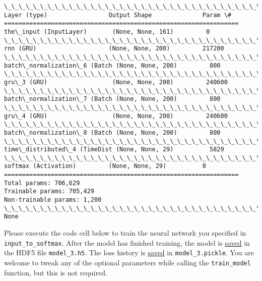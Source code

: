 \documentclass[11pt]{article}
\begin{document}
    \begin{Verbatim}[commandchars=\\\{\}]
\_\_\_\_\_\_\_\_\_\_\_\_\_\_\_\_\_\_\_\_\_\_\_\_\_\_\_\_\_\_\_\_\_\_\_\_\_\_\_\_\_\_\_\_\_\_\_\_\_\_\_\_\_\_\_\_\_\_\_\_\_\_\_\_\_
Layer (type)                 Output Shape              Param \#   
=================================================================
the\_input (InputLayer)       (None, None, 161)         0         
\_\_\_\_\_\_\_\_\_\_\_\_\_\_\_\_\_\_\_\_\_\_\_\_\_\_\_\_\_\_\_\_\_\_\_\_\_\_\_\_\_\_\_\_\_\_\_\_\_\_\_\_\_\_\_\_\_\_\_\_\_\_\_\_\_
rnn (GRU)                    (None, None, 200)         217200    
\_\_\_\_\_\_\_\_\_\_\_\_\_\_\_\_\_\_\_\_\_\_\_\_\_\_\_\_\_\_\_\_\_\_\_\_\_\_\_\_\_\_\_\_\_\_\_\_\_\_\_\_\_\_\_\_\_\_\_\_\_\_\_\_\_
batch\_normalization\_6 (Batch (None, None, 200)         800       
\_\_\_\_\_\_\_\_\_\_\_\_\_\_\_\_\_\_\_\_\_\_\_\_\_\_\_\_\_\_\_\_\_\_\_\_\_\_\_\_\_\_\_\_\_\_\_\_\_\_\_\_\_\_\_\_\_\_\_\_\_\_\_\_\_
gru\_3 (GRU)                  (None, None, 200)         240600    
\_\_\_\_\_\_\_\_\_\_\_\_\_\_\_\_\_\_\_\_\_\_\_\_\_\_\_\_\_\_\_\_\_\_\_\_\_\_\_\_\_\_\_\_\_\_\_\_\_\_\_\_\_\_\_\_\_\_\_\_\_\_\_\_\_
batch\_normalization\_7 (Batch (None, None, 200)         800       
\_\_\_\_\_\_\_\_\_\_\_\_\_\_\_\_\_\_\_\_\_\_\_\_\_\_\_\_\_\_\_\_\_\_\_\_\_\_\_\_\_\_\_\_\_\_\_\_\_\_\_\_\_\_\_\_\_\_\_\_\_\_\_\_\_
gru\_4 (GRU)                  (None, None, 200)         240600    
\_\_\_\_\_\_\_\_\_\_\_\_\_\_\_\_\_\_\_\_\_\_\_\_\_\_\_\_\_\_\_\_\_\_\_\_\_\_\_\_\_\_\_\_\_\_\_\_\_\_\_\_\_\_\_\_\_\_\_\_\_\_\_\_\_
batch\_normalization\_8 (Batch (None, None, 200)         800       
\_\_\_\_\_\_\_\_\_\_\_\_\_\_\_\_\_\_\_\_\_\_\_\_\_\_\_\_\_\_\_\_\_\_\_\_\_\_\_\_\_\_\_\_\_\_\_\_\_\_\_\_\_\_\_\_\_\_\_\_\_\_\_\_\_
time\_distributed\_4 (TimeDist (None, None, 29)          5829      
\_\_\_\_\_\_\_\_\_\_\_\_\_\_\_\_\_\_\_\_\_\_\_\_\_\_\_\_\_\_\_\_\_\_\_\_\_\_\_\_\_\_\_\_\_\_\_\_\_\_\_\_\_\_\_\_\_\_\_\_\_\_\_\_\_
softmax (Activation)         (None, None, 29)          0         
=================================================================
Total params: 706,629
Trainable params: 705,429
Non-trainable params: 1,200
\_\_\_\_\_\_\_\_\_\_\_\_\_\_\_\_\_\_\_\_\_\_\_\_\_\_\_\_\_\_\_\_\_\_\_\_\_\_\_\_\_\_\_\_\_\_\_\_\_\_\_\_\_\_\_\_\_\_\_\_\_\_\_\_\_
None

    \end{Verbatim}

    Please execute the code cell below to train the neural network you
specified in \texttt{input\_to\_softmax}. After the model has finished
training, the model is
\href{https://keras.io/getting-started/faq/\#how-can-i-save-a-keras-model}{saved}
in the HDF5 file \texttt{model\_3.h5}. The loss history is
\href{https://wiki.python.org/moin/UsingPickle}{saved} in
\texttt{model\_3.pickle}. You are welcome to tweak any of the optional
parameters while calling the \texttt{train\_model} function, but this is
not required.
\end{document}
